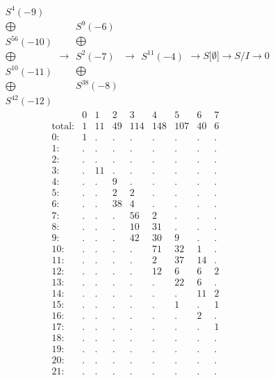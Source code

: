 \documentclass[12pt,a3paper,landscape]{amsart}
\numberwithin{equation}{section}
\theoremstyle{plain}
\theoremstyle{definition}
\begin{document}
$$\begin{matrix}
S^{4}(-9)\\ \bigoplus \\
S^{56}(-10)\\ \bigoplus \\
S^{10}(-11)\\ \bigoplus \\
S^{42}(-12)
\end{matrix}
\rightarrow\begin{matrix}
S^{9}(-6)\\ \bigoplus \\
S^{2}(-7)\\ \bigoplus \\
S^{38}(-8)
\end{matrix}
\rightarrow\begin{matrix}
S^{11}(-4)
\end{matrix}
\rightarrow S \lbrack \emptyset \rbrack \rightarrow S/I \rightarrow 0
$$
$$
\begin{matrix}
& 0 & 1 & 2 & 3 & 4 & 5 & 6 & 7 \\
\text{total}: & 1 & 11 & 49 & 114 & 148 & 107 & 40 & 6 \\
0: & 1 & . & . & . & . & . & . & . \\
1: & . & . & . & . & . & . & . & . \\
2: & . & . & . & . & . & . & . & . \\
3: & . & 11 & . & . & . & . & . & . \\
4: & . & . & 9 & . & . & . & . & . \\
5: & . & . & 2 & 2 & . & . & . & . \\
6: & . & . & 38 & 4 & . & . & . & . \\
7: & . & . & . & 56 & 2 & . & . & . \\
8: & . & . & . & 10 & 31 & . & . & . \\
9: & . & . & . & 42 & 30 & 9 & . & . \\
10: & . & . & . & . & 71 & 32 & 1 & . \\
11: & . & . & . & . & 2 & 37 & 14 & . \\
12: & . & . & . & . & 12 & 6 & 6 & 2 \\
13: & . & . & . & . & . & 22 & 6 & . \\
14: & . & . & . & . & . & . & 11 & 2 \\
15: & . & . & . & . & . & 1 & . & 1 \\
16: & . & . & . & . & . & . & 2 & . \\
17: & . & . & . & . & . & . & . & 1 \\
18: & . & . & . & . & . & . & . & . \\
19: & . & . & . & . & . & . & . & . \\
20: & . & . & . & . & . & . & . & . \\
21: & . & . & . & . & . & . & . & .
\end{matrix}
$$
\end{document}
